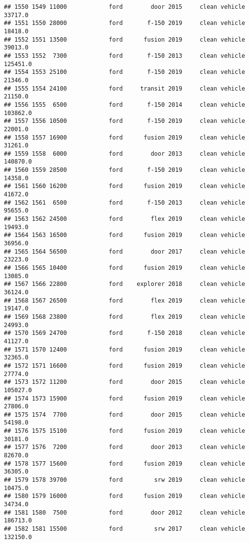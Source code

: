 \documentclass[
]{article}
\begin{document}
\begin{verbatim}
## 1550 1549 11000            ford        door 2015     clean vehicle   33717.0
## 1551 1550 28000            ford       f-150 2019     clean vehicle   18418.0
## 1552 1551 13500            ford      fusion 2019     clean vehicle   39013.0
## 1553 1552  7300            ford       f-150 2013     clean vehicle  125451.0
## 1554 1553 25100            ford       f-150 2019     clean vehicle   21346.0
## 1555 1554 24100            ford     transit 2019     clean vehicle   21150.0
## 1556 1555  6500            ford       f-150 2014     clean vehicle  103862.0
## 1557 1556 10500            ford       f-150 2019     clean vehicle   22001.0
## 1558 1557 16900            ford      fusion 2019     clean vehicle   31261.0
## 1559 1558  6000            ford        door 2013     clean vehicle  140870.0
## 1560 1559 28500            ford       f-150 2019     clean vehicle   14358.0
## 1561 1560 16200            ford      fusion 2019     clean vehicle   41672.0
## 1562 1561  6500            ford       f-150 2013     clean vehicle   95655.0
## 1563 1562 24500            ford        flex 2019     clean vehicle   19493.0
## 1564 1563 16500            ford      fusion 2019     clean vehicle   36956.0
## 1565 1564 56500            ford        door 2017     clean vehicle   23223.0
## 1566 1565 10400            ford      fusion 2019     clean vehicle   13085.0
## 1567 1566 22800            ford    explorer 2018     clean vehicle   36124.0
## 1568 1567 26500            ford        flex 2019     clean vehicle   19147.0
## 1569 1568 23800            ford        flex 2019     clean vehicle   24993.0
## 1570 1569 24700            ford       f-150 2018     clean vehicle   41127.0
## 1571 1570 12400            ford      fusion 2019     clean vehicle   32365.0
## 1572 1571 16600            ford      fusion 2019     clean vehicle   27774.0
## 1573 1572 11200            ford        door 2015     clean vehicle  105027.0
## 1574 1573 15900            ford      fusion 2019     clean vehicle   27806.0
## 1575 1574  7700            ford        door 2015     clean vehicle   54198.0
## 1576 1575 15100            ford      fusion 2019     clean vehicle   30181.0
## 1577 1576  7200            ford        door 2013     clean vehicle   82670.0
## 1578 1577 15600            ford      fusion 2019     clean vehicle   36305.0
## 1579 1578 39700            ford         srw 2019     clean vehicle   10475.0
## 1580 1579 16000            ford      fusion 2019     clean vehicle   34734.0
## 1581 1580  7500            ford        door 2012     clean vehicle  186713.0
## 1582 1581 15500            ford         srw 2017     clean vehicle  132150.0

\end{verbatim}
\end{document}
